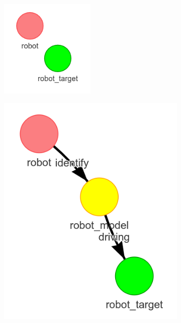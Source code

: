 \begin{figure}[H]
    \centering
    \begin{subfigure}{.3\textwidth}
    \centering
    \includegraphics[width=0.5\textwidth]{figures/connecting_nodes/blocking_obj/blocking_obj_1}
    \caption{}
    \end{subfigure}
    \begin{subfigure}{.3\textwidth}
    \centering
    \includegraphics[width=\textwidth]{figures/connecting_nodes/blocking_obj/blocking_obj_2}

\end{subfigure}
\end{figure}
